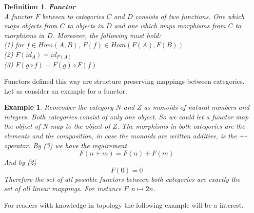 \documentclass[17pt]{extarticle}
\newtheorem{example}{Example}
\newtheorem{definition}{Definition}
\begin{document}
\begin{definition}
	\textbf{Functor}\\
	A functor $F$ between to categories $C$ and $D$ consists of two functions.
	One which maps objects from $C$ to objects in $D$ and one which maps morphisms from
	$C$ to morphisms in $D$. Moreover, the following must hold:\\
	(1) for $f\in Hom(A,B)$, $F(f)\in Hom(F(A), F(B))$\\
	(2) $F(id_A)=id_{F(A)}$\\
	(3) $F(g\circ f)=F(g)\circ F(f)$
\end{definition}
Functors defined this way are structure preserving mappings between categories.
Let us consider an example for a functor.

\begin{example}
	Remember the category $N$ and $Z$ as monoids of natural numbers and integers. Both categories consist
	of only one object. So we could let a functor map the object of $N$ map to the object of $Z$. The morphisms in
	both categories are the elements and the composition, in case the monoids are written additive, is the $+$-operator.
	By (3) we have the requirement
	$$F(n+m)=F(n)+F(m)$$
	And by (2)
	$$F(0)=0$$
	Therefore the set of all possible functors between both categories are exactly the set of all linear mappings.
	For instance $F:n\mapsto 2n$.
\end{example}
For readers with knowledge in topology the following example will be a interest.
\end{document}
